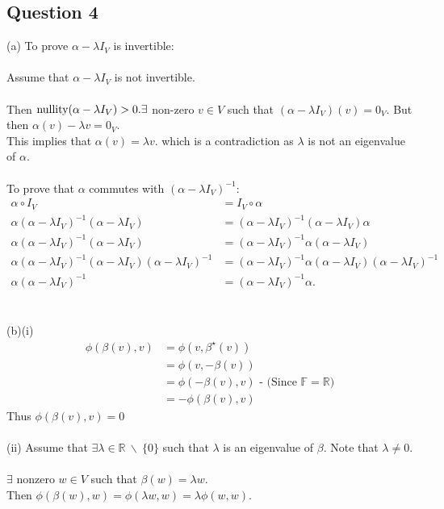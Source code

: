 \documentclass{article}
\begin{document}
\subsection*{Question 4}
(a) To prove $\alpha-\lambda I_V$ is invertible:\\\\ Assume that $\alpha - \lambda I_V$ is not invertible.\\\\Then $\text{nullity}(\alpha - \lambda I_V) > 0.\\ \exists$ non-zero $ v \in V$ such that $(\alpha - \lambda I_V)(v) = 0_V.$ But then $\alpha(v) - \lambda v = 0_V$. \\This implies that $\alpha(v) = \lambda v.$
which is a contradiction as $\lambda$ is not an eigenvalue of $\alpha.$
\\\\To prove that $\alpha$ commutes with $(\alpha - \lambda I_V)^{-1}:$\begin{align*}
\alpha\circ I_V &= I_V \circ \alpha
\\ \alpha(\alpha -\lambda I_V)^{-1} (\alpha -\lambda I_V) &= (\alpha -\lambda I_V)^{-1}(\alpha -\lambda I_V)\alpha
\\\alpha(\alpha -\lambda I_V)^{-1} (\alpha -\lambda I_V) &= (\alpha -\lambda I_V)^{-1}\alpha(\alpha -\lambda I_V)\\\alpha(\alpha -\lambda I_V)^{-1} (\alpha -\lambda I_V)(\alpha-\lambda I_V)^{-1} &= (\alpha -\lambda I_V)^{-1}\alpha(\alpha -\lambda I_V)(\alpha-\lambda I_V)^{-1}\\
\alpha(\alpha -\lambda I_V)^{-1} &= (\alpha-\lambda I_V)^{-1}\alpha.
\end{align*}\\\\
(b)(i)\begin{align*}
\phi(\beta(v),v) &= \phi(v,\beta^\star(v))\\
&= \phi(v,-\beta(v))\\
 &= \phi(-\beta(v),v) \text{ - (Since $\mathbb{F} = \mathbb{R}$)}\\
 &= -\phi(\beta(v),v)
\end{align*}
Thus $\phi(\beta(v),v) = 0$\\\\
(ii) Assume that $\exists \lambda \in \mathbb{R}\ \backslash\ \{0\}$ such that $\lambda$ is an eigenvalue of $\beta.$ Note that $\lambda \neq 0.$\\\\
$\exists$ nonzero $ w \in V$ such that $\beta(w) = \lambda w.$\\ Then $ \phi(\beta(w),w) = \phi(\lambda w,w) = \lambda \phi(w,w).$\\
\end{document}
